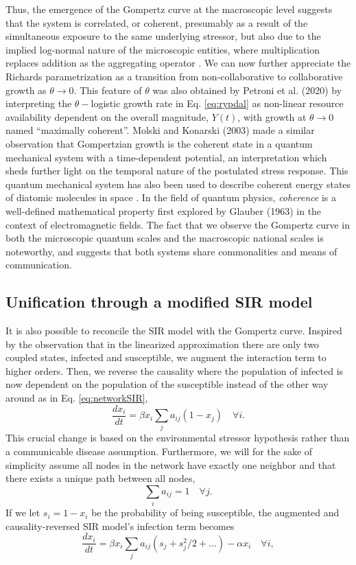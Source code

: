 \documentclass[sn-mathphys]{sn-jnl}%
\theoremstyle{thmstyleone}%
\theoremstyle{thmstyletwo}%
\theoremstyle{thmstylethree}%
\begin{document}
Thus, the emergence of the Gompertz curve at the macroscopic level suggests that the system is correlated, or coherent, presumably as a result of the simultaneous exposure to the same underlying stressor, but also due to the implied log-normal nature of the microscopic entities, where multiplication replaces addition as the aggregating operator \cite{zhang1994log}.
We can now further appreciate the Richards parametrization as a transition from non-collaborative to collaborative growth as $\theta \rightarrow 0$. 
This feature of $\theta$ was also obtained by Petroni et al. (2020) \cite{petroni2020logistic} by interpreting the $\theta-$logistic growth rate in Eq. \ref{eq:rypdal} as non-linear resource availability dependent on the overall magnitude, $Y(t)$, with growth at $\theta \rightarrow 0$ named ``maximally coherent''. 
Molski and Konarski (2003) \cite{molski2003coherent} made a similar observation that Gompertzian growth is the coherent state in a quantum mechanical system with a time-dependent potential, an interpretation which sheds further light on the temporal nature of the postulated stress response.
This quantum mechanical system has also been used to describe coherent energy states of diatomic molecules in space \cite{morse1929diatomic}. 
In the field of quantum physics, \emph{coherence} is a well-defined mathematical property first explored by Glauber (1963) \cite{glauber1963coherent} in the context of electromagnetic fields. The fact that we observe the Gompertz curve in both the microscopic quantum scales and the macroscopic national scales is noteworthy, and suggests that both systems share commonalities and means of communication.

\subsection*{Unification through a modified SIR model}
It is also possible to reconcile the SIR model with the Gompertz curve. 
Inspired by the observation that in the linearized approximation there are only two coupled states, infected and susceptible, we augment the interaction term to higher orders. 
Then, we reverse the causality where the population of infected is now dependent on the population of the susceptible instead of the other way around as in Eq. \ref{eq:networkSIR},
\begin{equation}
\label{eq:reverseNetworkSIR}
\frac{d x_i}{dt} = \beta x_i\sum_j{a_{ij}}(1-x_j) \quad \forall i.
\end{equation} 
This crucial change is based on the environmental stressor hypothesis rather than a communicable disease assumption.
Furthermore, we will for the sake of simplicity assume all nodes in the network have exactly one neighbor and that there exists a unique path between all nodes,
\begin{equation}
\sum_i a_{ij} = 1 \quad \forall j.
\end{equation} 
If we let $s_i = 1 - x_i$ be the probability of being susceptible, the augmented and causality-reversed SIR model's infection term becomes 
\begin{equation}
\frac{d x_i}{dt} = \beta x_i\sum_j{a_{ij}}(s_{j} + s^2_j/2 + ...) - \alpha x_i\quad \forall i,
\end{equation}
\end{document}
